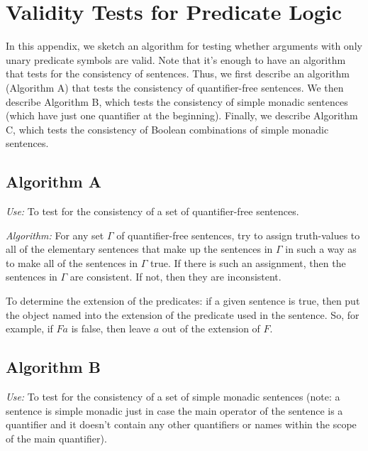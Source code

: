 \chapter{Validity Tests for Predicate Logic} \label{algorithms}

In this appendix, we sketch an algorithm for testing whether arguments
with only unary predicate symbols are valid.  Note that it's enough to
have an algorithm that tests for the consistency of sentences.  Thus,
we first describe an algorithm (Algorithm A) that tests the
consistency of quantifier-free sentences.  We then describe Algorithm
B, which tests the consistency of simple monadic sentences (which have
just one quantifier at the beginning).  Finally, we describe Algorithm
C, which tests the consistency of Boolean combinations of simple
monadic sentences.

\section{Algorithm A}

\textit{Use:} To test for the consistency of a set of quantifier-free
sentences.

\bigskip\noindent \textit{Algorithm:} For any set $\Gamma$ of
quantifier-free sentences, try to assign truth-values to all of the
elementary sentences that make up the sentences in $\Gamma$ in such a
way as to make all of the sentences in $\Gamma$ true.  If there is
such an assignment, then the sentences in $\Gamma$ are consistent.  If
not, then they are inconsistent.

To determine the extension of the predicates: if a given sentence is
true, then put the object named into the extension of the predicate
used in the sentence.  So, for example, if $Fa$ is false, then leave
$a$ out of the extension of $F$.

\section{Algorithm B}

\textit{Use:} To test for the consistency of a set
of simple monadic sentences (note: a sentence is simple monadic just
in case the main operator of the sentence is a quantifier and it
doesn't contain any other quantifiers or names within the scope of the
main quantifier).

